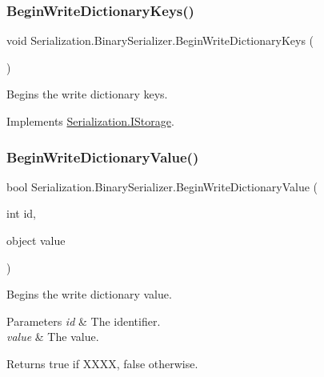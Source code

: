 \subsubsection{\texorpdfstring{Begin\+Write\+Dictionary\+Keys()}{BeginWriteDictionaryKeys()}}
{\footnotesize\ttfamily void Serialization.\+Binary\+Serializer.\+Begin\+Write\+Dictionary\+Keys (\begin{DoxyParamCaption}{ }\end{DoxyParamCaption})\hspace{0.3cm}{\ttfamily [inline]}}



Begins the write dictionary keys. 



Implements \hyperlink{interface_serialization_1_1_i_storage_a06dcc7ec3a100509abc863136d0cd6f3}{Serialization.\+I\+Storage}.

\mbox{\label{class_serialization_1_1_binary_serializer_a4dc4587767b33a9c6310da4de7314cc8}} 
\subsubsection{\texorpdfstring{Begin\+Write\+Dictionary\+Value()}{BeginWriteDictionaryValue()}}
{\footnotesize\ttfamily bool Serialization.\+Binary\+Serializer.\+Begin\+Write\+Dictionary\+Value (\begin{DoxyParamCaption}\item[{int}]{id,  }\item[{object}]{value }\end{DoxyParamCaption})\hspace{0.3cm}{\ttfamily [inline]}}



Begins the write dictionary value. 


\begin{DoxyParams}{Parameters}
{\em id} & The identifier.\\
\hline
{\em value} & The value.\\
\hline
\end{DoxyParams}
\begin{DoxyReturn}{Returns}
{\ttfamily true} if X\+X\+XX, {\ttfamily false} otherwise.
\end{DoxyReturn}


